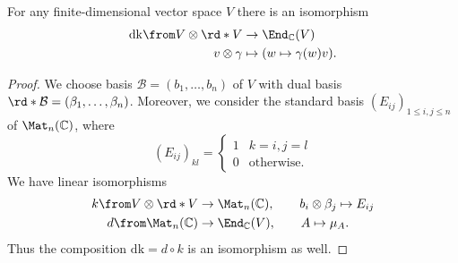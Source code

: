 \documentclass[a4paper,oneside, 12pt]{amsart}
\begin{document}
\begin{proposition}\label{prop:can-iso}
  For any finite-dimensional vector space \(V\) there is an isomorphism
  \begin{align*}
    \mathrm{dk} \from V\otimes \rd*{V} &\to \End_{ \mathbb{C}}(V)\\
    v \otimes \gamma  &\mapsto (w \mapsto \gamma(w)v).
  \end{align*}
\end{proposition}
\begin{proof}
  We choose basis \(\mathcal{B}=(b_{1}, \dots , b_{n})\) of \(V\) with dual basis \(\rd*{\mathcal{B}}= (\beta_{1}, \dots , \beta_{n})\).
  Moreover, we consider the standard basis \((E_{ij})_{1\leq i,j \leq n}\) of \(\Mat_{n}( \mathbb{C})\),
  where
  \begin{equation*}
    (E_{ij})_{kl}=
    \begin{cases}
      1 & k=i, j=l \\
      0 & \text{otherwise.}
    \end{cases}
  \end{equation*}
  We have linear isomorphisms
  \begin{align*}
    k\from  V\otimes \rd*{V} &\to \Mat_{n}( \mathbb{C}),\qquad  b_{i}\otimes \beta_{j}\mapsto E_{ij} \\
    d \from \Mat_{n}( \mathbb{C}) &\to \End_{ \mathbb{C}}(V), \qquad A \mapsto \mu_{A}.
  \end{align*}
  Thus the composition \(\mathrm{dk} = d\circ k\) is an isomorphism as well.
\end{proof}
\end{document}
